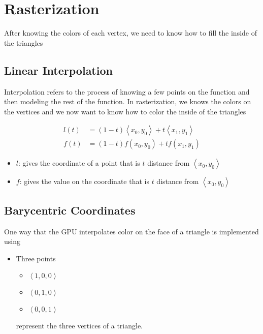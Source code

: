 \section{Rasterization}

  After knowing the colors of each vertex, we need to know how to fill the
  inside of the triangles

\subsection{Linear Interpolation}

  Interpolation refers to the process of knowing a few points on the function
  and then modeling the rest of the function. In rasterization, we knows
  the colors on the vertices and we now want to know how to color the inside
  of the triangles

  \begin{align*}
    l\left( t \right) &=
      \left( 1 - t \right) \left< x_{0}, y_{0} \right>
      + t \left< x_{1}, y_{1} \right> \\
    f\left( t \right) &=
      \left( 1 - t \right) f\left( x_{0}, y_{0} \right)
      + t f\left( x_{1}, y_{1} \right)
  \end{align*}

  \begin{itemize}
    \item $ l $: gives the coordinate of a point that is $ t $ distance
    from $ \left< x_{0}, y_{0} \right> $
    \item $ f $: gives the value on the coordinate that is $ t $ distance
    from $ \left< x_{0}, y_{0} \right> $
  \end{itemize}

\subsection{Barycentric Coordinates}

  One way that the GPU interpolates color on the face of a triangle is
  implemented using 

  \begin{itemize}
    \item Three points
    \begin{itemize}
      \item $ \left< 1, 0, 0 \right> $
      \item $ \left< 0, 1, 0 \right> $
      \item $ \left< 0, 0, 1 \right> $
    \end{itemize}
    represent the three vertices of a triangle.
  \end{itemize}

